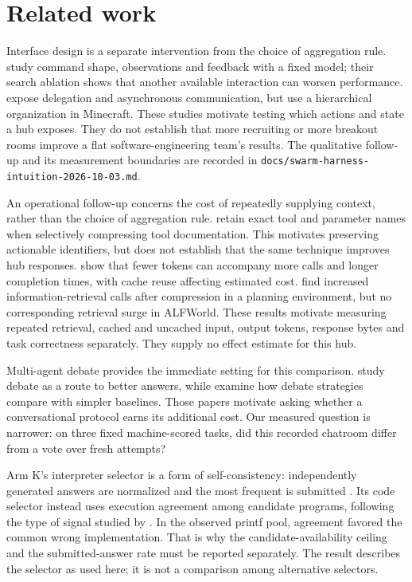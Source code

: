 \section{Related work}
\label{sec:related-work}

Interface design is a separate intervention from the choice of aggregation rule. \citet{Yang2024SWEAgent} study command shape, observations and feedback with a fixed model; their search ablation shows that another available interaction can worsen performance. \citet{Chen2024SAgents} expose delegation and asynchronous communication, but use a hierarchical organization in Minecraft. These studies motivate testing which actions and state a hub exposes. They do not establish that more recruiting or more breakout rooms improve a flat software-engineering team's results. The qualitative follow-up and its measurement boundaries are recorded in \texttt{docs/swarm-harness-intuition-2026-10-03.md}.

An operational follow-up concerns the cost of repeatedly supplying context, rather than the choice of aggregation rule. \citet{Xu2024Compression} retain exact tool and parameter names when selectively compressing tool documentation. This motivates preserving actionable identifiers, but does not establish that the same technique improves hub responses. \citet{Satish2026Compression} show that fewer tokens can accompany more calls and longer completion times, with cache reuse affecting estimated cost. \citet{Liu2026Interaction} find increased information-retrieval calls after compression in a planning environment, but no corresponding retrieval surge in ALFWorld. These results motivate measuring repeated retrieval, cached and uncached input, output tokens, response bytes and task correctness separately. They supply no effect estimate for this hub.

Multi-agent debate provides the immediate setting for this comparison. \citet{Du2023} study debate as a route to better answers, while \citet{Smit2023} examine how debate strategies compare with simpler baselines. Those papers motivate asking whether a conversational protocol earns its additional cost. Our measured question is narrower: on three fixed machine-scored tasks, did this recorded chatroom differ from a vote over fresh attempts?

Arm K's interpreter selector is a form of self-consistency: independently generated answers are normalized and the most frequent is submitted \citep{selfconsistency2022}. Its code selector instead uses execution agreement among candidate programs, following the type of signal studied by \citet{mbrexec2022}. In the observed printf pool, agreement favored the common wrong implementation. That is why the candidate-availability ceiling and the submitted-answer rate must be reported separately. The result describes the selector as used here; it is not a comparison among alternative selectors.



